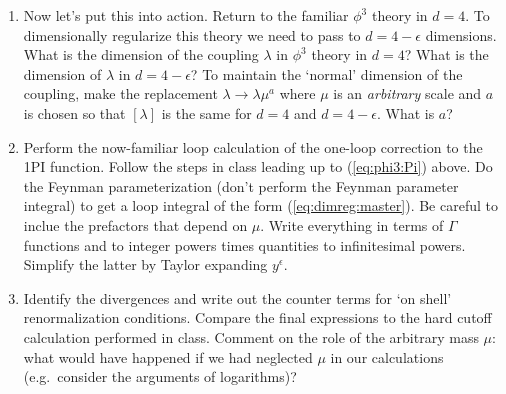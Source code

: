 \documentclass[12pt]{article}
\begin{document}
\begin{enumerate}
\begin{enumerate}
\item Now let's put this into action. Return to the familiar $\phi^3$ theory in $d=4$. To dimensionally regularize this theory we need to pass to $d=4-\epsilon$ dimensions. What is the dimension of the coupling $\lambda$ in $\phi^3$ theory in $d=4$? What is the dimension of $\lambda$ in $d=4-\epsilon$? To maintain the `normal' dimension of the coupling, make the replacement $\lambda \to \lambda \mu^a$ where $\mu$ is an \textit{arbitrary} scale and $a$ is chosen so that $[\lambda]$ is the same for $d=4$ and $d=4-\epsilon$. What is $a$?

\item Perform the now-familiar loop calculation of the one-loop correction to the 1PI function. Follow the steps in class leading up to (\ref{eq:phi3:Pi}) above. Do the Feynman parameterization (don't perform the Feynman parameter integral) to get a loop integral of the form (\ref{eq:dimreg:master}). Be careful to inclue the prefactors that depend on $\mu$. Write everything in terms of $\Gamma$ functions and to integer powers times quantities to infinitesimal powers. Simplify the latter by Taylor expanding $y^{\epsilon}$.

\item Identify the divergences and write out the counter terms for `on shell' renormalization conditions. Compare the final expressions to the hard cutoff calculation performed in class. Comment on the role of the arbitrary mass $\mu$: what would have happened if we had neglected $\mu$ in our calculations (e.g.\ consider the arguments of logarithms)? %

\end{enumerate}










\end{enumerate}
\end{document}
